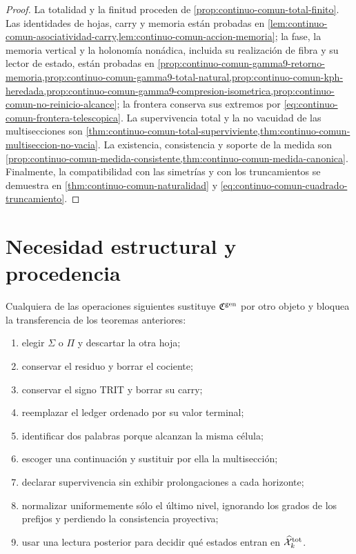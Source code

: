 \begin{proof}
La totalidad y la finitud proceden de
\cref{prop:continuo-comun-total-finito}.  Las identidades de hojas, carry y
memoria están probadas en
\cref{lem:continuo-comun-asociatividad-carry,lem:continuo-comun-accion-memoria}; la fase, la memoria vertical y la
holonomía nonádica, incluida su realización de fibra y su lector de estado,
están probadas en
\cref{prop:continuo-comun-gamma9-retorno-memoria,prop:continuo-comun-gamma9-total-natural,prop:continuo-comun-kph-heredada,prop:continuo-comun-gamma9-compresion-isometrica,prop:continuo-comun-no-reinicio-alcance}; la frontera conserva sus extremos por
\eqref{eq:continuo-comun-frontera-telescopica}.  La supervivencia total y la
no vacuidad de las multisecciones son
\cref{thm:continuo-comun-total-superviviente,thm:continuo-comun-multiseccion-no-vacia}.  La existencia, consistencia y
soporte de la medida son
\cref{prop:continuo-comun-medida-consistente,thm:continuo-comun-medida-canonica}.  Finalmente, la compatibilidad con las
simetrías y con los truncamientos se demuestra en
\cref{thm:continuo-comun-naturalidad} y
\eqref{eq:continuo-comun-cuadrado-truncamiento}.
\end{proof}

\section{Necesidad estructural y procedencia}
\label{sec:continuo-comun-falsadores}

\begin{proposition}
\label{prop:continuo-comun-falsadores}
Cualquiera de las operaciones siguientes sustituye
\(\mathfrak C^{\rm gen}\) por otro objeto y bloquea la transferencia de los
teoremas anteriores:
\begin{enumerate}
 \item elegir \(\Sigma\) o \(\Pi\) y descartar la otra hoja;
 \item conservar el residuo y borrar el cociente;
 \item conservar el signo TRIT y borrar su carry;
 \item reemplazar el ledger ordenado por su valor terminal;
 \item identificar dos palabras porque alcanzan la misma célula;
 \item escoger una continuación y sustituir por ella la multisección;
 \item declarar supervivencia sin exhibir prolongaciones a cada horizonte;
 \item normalizar uniformemente sólo el último nivel, ignorando los grados de
       los prefijos y perdiendo la consistencia proyectiva;
 \item usar una lectura posterior para decidir qué estados entran en
       \(\widehat{\mathcal X}^{\rm tot}_k\).
\end{enumerate}
\end{proposition}


